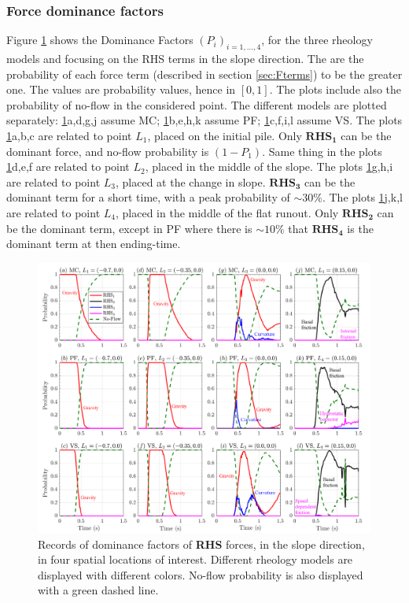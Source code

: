 \documentclass{article}
\begin{document}
\subsubsection{Force dominance factors}\label{stat1}
Figure \ref{fig:Ramp-Pr_x} shows the Dominance Factors $(P_i)_{i=1,\dots,4}$, for the three rheology models and focusing on the RHS terms in the slope direction. The are the probability of each force term (described in section \ref{sec:Fterms}) to be the greater one. The values are probability values, hence in $[0,1]$. The plots include also the probability of no-flow in the considered point. The different models are plotted separately: \ref{fig:Ramp-Pr_x}a,d,g,j assume MC; \ref{fig:Ramp-Pr_x}b,e,h,k assume PF; \ref{fig:Ramp-Pr_x}c,f,i,l assume VS. The plots \ref{fig:Ramp-Pr_x}a,b,c are related to point $L_1$, placed on the initial pile. Only $\boldsymbol{RHS_1}$ can be the dominant force, and no-flow probability is $(1-P_1)$. Same thing in the plots \ref{fig:Ramp-Pr_x}d,e,f are related to point $L_2$, placed in the middle of the slope. The plots \ref{fig:Ramp-Pr_x}g,h,i are related to point $L_3$, placed at the change in slope. $\boldsymbol{RHS_3}$ can be the dominant term for a short time, with a peak probability of $\sim 30\%$. The plots \ref{fig:Ramp-Pr_x}j,k,l are related to point $L_4$, placed in the middle of the flat runout. Only $\boldsymbol{RHS_2}$ can be the dominant term, except in PF where there is $\sim 10\%$ that $\boldsymbol{RHS_4}$ is the dominant term at then ending-time.
\begin{figure}[H]
         \centering
        \includegraphics[width=1\textwidth]{InclinedPlane/ForceContrib/Pr_x.png}
        \caption{Records of dominance factors of \textbf{RHS} forces, in the slope direction, in four spatial locations of interest. Different rheology models are displayed with different colors. No-flow probability is also displayed with a green dashed line.}
        \label{fig:Ramp-Pr_x}
\end{figure}
\end{document}
